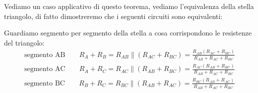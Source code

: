 \documentclass[a4paper, oneside]{article}
\begin{document}
\begin{example}
    Vediamo un caso applicativo di questo teorema, vediamo l'equivalenza della stella triangolo, di fatto dimostreremo che i seguenti circuiti sono equivalenti:
    \begin{center}
    \end{center}
Guardiamo segmento per segmento della stella a cosa corrispondono le resistenze del triangolo:
\begin{gather*}
    \text{segmento AB} \qquad R_A + R_B = R_{AB} \parallel (R_{AC} + R_{BC}) = \frac{R_{AB}(R_{AC} + R_{BC})}{R_{AB} + R_{AC} + R_{BC}}\\
    \text{segmento AC} \qquad R_A + R_C = R_{AC} \parallel (R_{AB} + R_{BC}) = \frac{R_{AC}(R_{AB} + R_{BC})}{R_{AB} + R_{AC} + R_{BC}}\\
    \text{segmento BC} \qquad R_B + R_C = R_{BC} \parallel (R_{AB} + R_{AC}) = \frac{R_{BC}(R_{AB} + R_{AC})}{R_{AB} + R_{AC} + R_{BC}}

\end{gather*}
\end{example}
\end{document}
